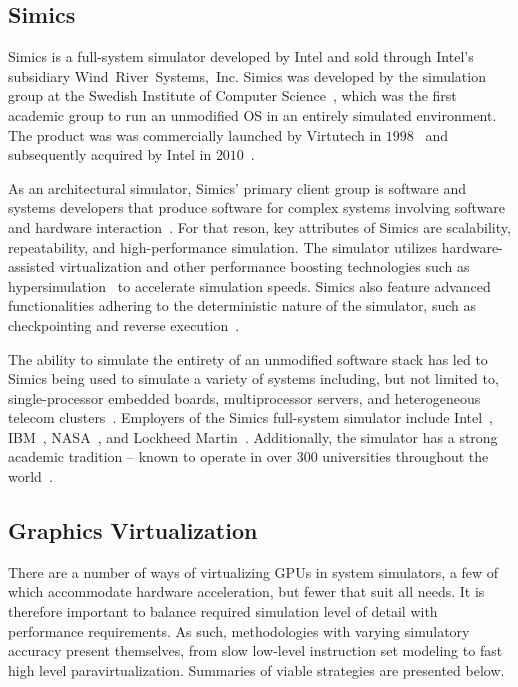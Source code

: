 \subsection{Simics}
\label{sec:simics}
Simics is a full-system simulator developed by Intel and sold through Intel's subsidiary Wind~River~Systems,~Inc.
Simics was developed by the simulation group at the Swedish Institute of Computer Science~, which was the first academic group to run an unmodified OS in an entirely simulated environment.
The product was was commercially launched by Virtutech in $1998$~ and subsequently acquired by Intel in $2010$~.

As an architectural simulator, Simics' primary client group is software and systems developers that produce software for complex systems involving software and hardware interaction~.
For that reson, key attributes of Simics are scalability, repeatability, and high-performance simulation.
The simulator utilizes hardware-assisted virtualization and other performance boosting technologies such as hypersimulation~ to accelerate simulation speeds.
Simics also feature advanced functionalities adhering to the deterministic nature of the simulator, such as checkpointing and reverse execution~.

The ability to simulate the entirety of an unmodified software stack has led to Simics being used to simulate a variety of systems including, but not limited to, single-processor embedded boards, multiprocessor servers, and heterogeneous telecom clusters~.
Employers of the Simics full-system simulator include Intel~, IBM~, NASA~, and Lockheed Martin~.
Additionally, the simulator has a strong academic tradition -- known to operate in over $300$ universities throughout the world~.

\subsection{Graphics Virtualization}
\label{sec:previousresearch_graphicsvirtualization}
There are a number of ways of virtualizing GPUs in system simulators, a few of which accommodate hardware acceleration, but fewer that suit all needs.
It is therefore important to balance required simulation level of detail with performance requirements.
As such, methodologies with varying simulatory accuracy present themselves, from slow low-level instruction set modeling to fast high level paravirtualization.
Summaries of viable strategies are presented below.

